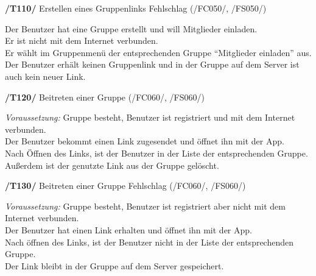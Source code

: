 \textbf{/T110/} Erstellen eines Gruppenlinks Fehlschlag (/FC050/, /FS050/)\\
\begin{center}
\vspace{-\parskip}
\begin{minipage}[t]{0.9\textwidth}
Der Benutzer hat eine Gruppe erstellt und will Mitglieder einladen.            \\
Er ist nicht mit dem Internet verbunden.                                        \\
Er wählt im Gruppenmenü der entsprechenden Gruppe "`Mitglieder einladen"' aus.     \\
Der Benutzer erhält keinen Gruppenlink und in der Gruppe auf dem Server ist auch kein neuer Link.\\
\end{minipage}
\end{center}

\textbf{/T120/} Beitreten einer Gruppe (/FC060/, /FS060/)\\
\begin{center}
\vspace{-\parskip}
\begin{minipage}[t]{0.9\textwidth}
\emph{Voraussetzung:} Gruppe besteht, Benutzer ist registriert und mit dem Internet verbunden. \\
Der Benutzer bekommt einen Link zugesendet und öffnet ihn mit der App.                   \\
Nach Öffnen des Links, ist der Benutzer in der Liste der entsprechenden Gruppe.           \\
Außerdem ist der genutzte Link aus der Gruppe gelöscht.                                    \\
\end{minipage}
\end{center}

\textbf{/T130/} Beitreten einer Gruppe Fehlschlag (/FC060/, /FS060/)\\
\begin{center}
\vspace{-\parskip}
\begin{minipage}[t]{0.9\textwidth}
\emph{Voraussetzung:} Gruppe besteht, Benutzer ist registriert aber nicht mit dem Internet verbunden.\\
Der Benutzer hat einen Link erhalten und öffnet ihn mit der App.                               \\
Nach öffnen des Links, ist der Benutzer nicht in der Liste der entsprechenden Gruppe.           \\
Der Link bleibt in der Gruppe auf dem Server gespeichert.                                        \\
\end{minipage}
\end{center}

